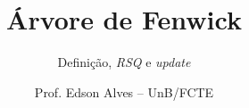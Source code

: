 \title{Árvore de Fenwick}
\subtitle{Definição, \textit{RSQ} e \textit{update}}
\author{Prof. Edson Alves -- UnB/FCTE}
\date{}
